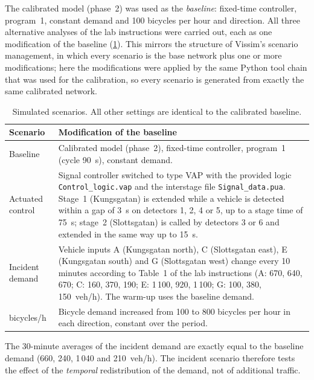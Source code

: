 \documentclass[11pt,a4paper]{article}
\newcommand{\code}[1]{\texttt{#1}}
\begin{document}
The calibrated model (phase~2) was used as the \emph{baseline}: fixed-time controller, program~1,
constant demand and 100 bicycles per hour and direction. All three alternative analyses of the lab
instructions were carried out, each as one modification of the baseline (\cref{tab:scenarios}).
This mirrors the structure of Vissim's scenario management, in which every scenario is the base
network plus one or more modifications; here the modifications were applied by the same Python tool
chain that was used for the calibration, so every scenario is generated from exactly the same
calibrated network.

\begin{table}[!htb]
\centering
\caption[Simulated scenarios]{Simulated scenarios. All other settings are identical to the
calibrated baseline.}
\label{tab:scenarios}
\small
\begin{tabularx}{\textwidth}{>{\raggedright\arraybackslash}p{2.6cm}X}
\toprule
\textbf{Scenario} & \textbf{Modification of the baseline}\\
\midrule
Baseline & Calibrated model (phase~2), fixed-time controller, program~1 (cycle 90~s), constant
demand.\\
Actuated control & Signal controller switched to type VAP with the provided logic
\code{Control\_logic.vap} and the interstage file \code{Signal\_data.pua}. Stage~1 (Kungsgatan) is
extended while a vehicle is detected within a gap of 3~s on detectors 1, 2, 4 or 5, up to a stage
time of 75~s; stage~2 (Slottsgatan) is called by detectors 3 or 6 and extended in the same way up
to 15~s.\\
Incident demand & Vehicle inputs A (Kungsgatan north), C (Slottsgatan east), E (Kungsgatan south)
and G (Slottsgatan west) change every 10 minutes according to Table~1 of the lab instructions
(A: 670, 640, 670; C: 160, 370, 190; E: 1\,100, 920, 1\,100; G: 100, 380, 150~veh/h). The warm-up
uses the baseline demand.\\
800 bicycles/h & Bicycle demand increased from 100 to 800 bicycles per hour in each direction,
constant over the period.\\
\bottomrule
\end{tabularx}
\end{table}

The 30-minute averages of the incident demand are exactly equal to the baseline demand (660, 240,
1\,040 and 210~veh/h). The incident scenario therefore tests the effect of the \emph{temporal}
redistribution of the demand, not of additional traffic.
\end{document}
